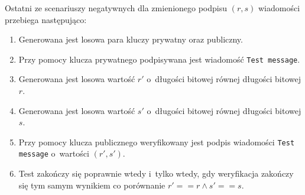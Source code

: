 \documentclass{article}
\begin{document}
        Ostatni ze scenariuszy negatywnych dla zmienionego podpisu $(r, s)$ wiadomości przebiega następująco:
        
        \begin{enumerate}
            \item Generowana jest losowa para kluczy prywatny oraz publiczny.
            \item Przy pomocy klucza prywatnego podpisywana jest wiadomość \verb+Test message+.
            \item Generowana jest losowa wartość $r'$ o~długości bitowej równej długości bitowej $r$.
            \item Generowana jest losowa wartość $s'$ o~długości bitowej równej długości bitowej $s$.
            \item Przy pomocy klucza publicznego weryfikowany jest podpis wiadomości \verb+Test message+ o~wartości $(r', s')$.
            \item Test zakończy się poprawnie wtedy i~tylko wtedy, gdy weryfikacja zakończy się tym samym wynikiem co porównanie $r' == r \wedge s' == s$.
        \end{enumerate}
        
\end{document}
